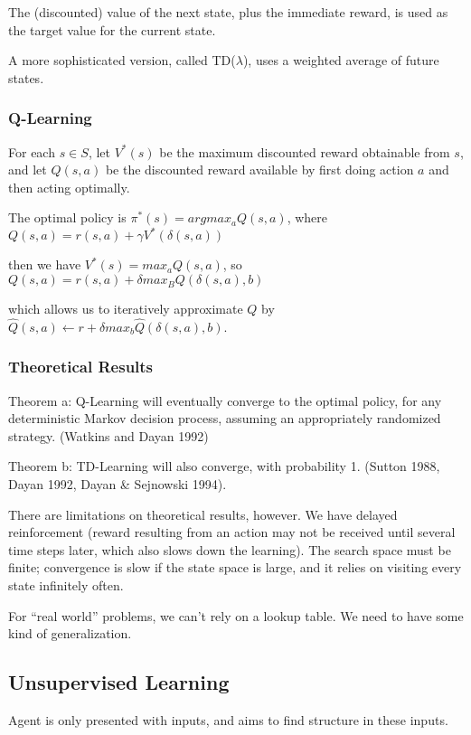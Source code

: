 The (discounted) value of the next state, plus the immediate reward, is used as
the target value for the current state.

A more sophisticated version, called TD($\lambda$), uses a weighted average of
future states.

\subsubsection{Q-Learning}

For each $s \in S$, let $V^*(s)$ be the maximum discounted reward obtainable
from $s$, and let $Q(s,a)$ be the discounted reward available by first doing
action $a$ and then acting optimally.

The optimal policy is $\pi^*(s) = argmax_a Q(s,a)$, where $Q(s,a) = r(s,a) +
\gamma V^{*}(\delta(s,a))$

then we have $V^*(s) = max_a Q(s,a)$, so $Q(s,a) = r(s,a) + \delta max_B
Q(\delta(s,a),b)$

which allows us to iteratively approximate $Q$ by $\hat{Q}(s,a) \leftarrow r +
\delta max_b \hat{Q}(\delta(s,a),b)$.

\subsubsection{Theoretical Results}
Theorem a: Q-Learning will eventually converge to the optimal policy, for any
deterministic Markov decision process, assuming an appropriately randomized
strategy. (Watkins and Dayan 1992)

Theorem b: TD-Learning will also converge, with probability 1. (Sutton 1988,
Dayan 1992, Dayan \& Sejnowski 1994).

There are limitations on theoretical results, however. We have delayed
reinforcement (reward resulting from an action may not be received until
several time steps later, which also slows down the learning). The search space
must be finite; convergence is slow if the state space is large, and it relies
on visiting every state infinitely often.

For ``real world'' problems, we can't rely on a lookup table. We need to have
some kind of generalization.

\subsection{Unsupervised Learning}
Agent is only presented with inputs, and aims to find structure in these
inputs.
